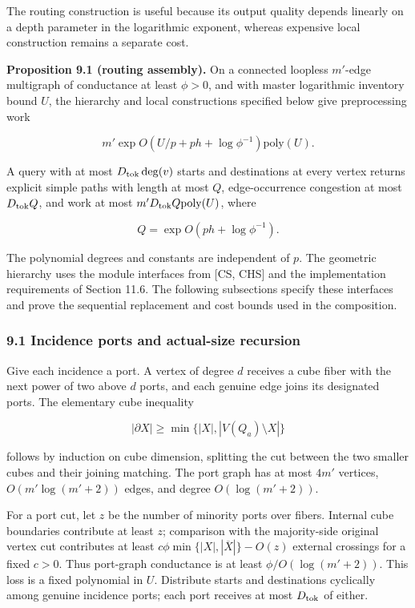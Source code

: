 The routing construction is useful because its output quality depends linearly on a depth parameter in the logarithmic exponent, whereas expensive local construction remains a separate cost.

\textbf{Proposition 9.1 (routing assembly).} On a connected loopless \(m'\)-edge multigraph of conductance at least \(\phi>0\), and with master logarithmic inventory bound \(U\), the hierarchy and local constructions specified below give preprocessing work

\[
m'\exp O(U/p+ph+\log\phi^{-1})\mathrm{poly}(U).
 \tag{32}
\]

A query with at most \(D_{\rm tok}\deg(v)\) starts and destinations at every vertex returns explicit simple paths with length at most \(Q\), edge-occurrence congestion at most \(D_{\rm tok}Q\), and work at most \(m'D_{\rm tok}Q\mathrm{poly}(U)\), where

\[
Q=\exp O(ph+\log\phi^{-1}).
 \tag{33}
\]

The polynomial degrees and constants are independent of \(p\). The geometric hierarchy uses the module interfaces from {[}CS, CHS{]} and the implementation requirements of Section 11.6. The following subsections specify these interfaces and prove the sequential replacement and cost bounds used in the composition.

\hypertarget{af-46593eb93e-incidence-ports-and-actual-size-recursion}{%
\subsubsection{9.1 Incidence ports and actual-size recursion}\label{af-46593eb93e-incidence-ports-and-actual-size-recursion}}

Give each incidence a port. A vertex of degree \(d\) receives a cube fiber with the next power of two above \(d\) ports, and each genuine edge joins its designated ports. The elementary cube inequality

\[
|\partial X|\geq\min\{|X|,|V(Q_a)\setminus X|\}
 \tag{34}
\]

follows by induction on cube dimension, splitting the cut between the two smaller cubes and their joining matching. The port graph has at most \(4m'\) vertices, \(O(m'\log(m'+2))\) edges, and degree \(O(\log(m'+2))\).

For a port cut, let \(z\) be the number of minority ports over fibers. Internal cube boundaries contribute at least \(z\); comparison with the majority-side original vertex cut contributes at least \(c\phi\min\{|X|,|\overline X|\}-O(z)\) external crossings for a fixed \(c>0\). Thus port-graph conductance is at least \(\phi/O(\log(m'+2))\). This loss is a fixed polynomial in \(U\). Distribute starts and destinations cyclically among genuine incidence ports; each port receives at most \(D_{\rm tok}\) of either.

